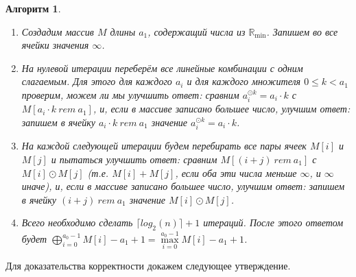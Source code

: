 \documentclass[12pt]{article}
\newtheorem{algorithm}[theorem]{Алгоритм}
\begin{document}
\begin{algorithm} { \ }
\label{algorithm}
\begin{enumerate}
	\item Создадим массив $M$ длины $a_1$, содержащий числа из $\mathbb{R}_{\min}$. Запишем во все ячейки значения $\infty$.
	

	
	\item На нулевой итерации переберём все линейные комбинации с одним слагаемым. Для этого для каждого $a_i$ и для каждого множителя $0 \le k < a_1$ проверим, можем ли мы улучшить ответ: сравним $a_i^{\odot k} = a_i \cdot k$ с $M[a_i \cdot k \ rem \ a_1]$, и, если в массиве записано большее число, улучшим ответ: запишем в ячейку $a_i \cdot k \ rem \ a_1$ значение $a_i^{\odot k} = a_i \cdot k$.
	
	\item На каждой следующей итерации будем перебирать все пары ячеек $M[i]$ и $M[j]$ и пытаться улучшить ответ: сравним $M[(i + j) \ rem \ a_1]$ с $M[i] \odot M[j]$ (т.е. $M[i] + M[j]$, если оба эти числа меньше $\infty$, и $\infty$ иначе), и, если в массиве записано большее число, улучшим ответ: запишем в ячейку $(i + j) \ rem \ a_1$ значение $M[i] \odot M[j]$.
	
	\item Всего необходимо сделать $\lceil log_2(n) \rceil + 1$ итераций. После этого ответом будет $\bigoplus \limits_{i = 0}^{a_0 - 1} M[i] - a_1 + 1 = \max\limits_{i = 0}^{a_0 - 1} M[i] - a_1 + 1$.
\end{enumerate}
\end{algorithm}

Для доказательства корректности докажем следующее утверждение.
\end{document}
